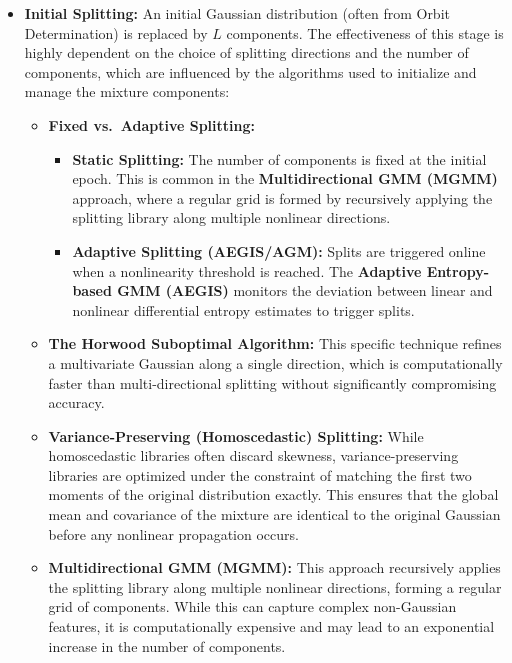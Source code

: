 \documentclass[
  letterpaper,
  DIV=11,
  numbers=noendperiod,
  oneside]{scrartcl}
\begin{document}
\begin{itemize}
\item
  \textbf{Initial Splitting:} An initial Gaussian distribution (often
  from Orbit Determination) is replaced by \(L\) components. The
  effectiveness of this stage is highly dependent on the choice of
  splitting directions and the number of components, which are
  influenced by the algorithms used to initialize and manage the mixture
  components:

  \begin{itemize}
  \item
    \textbf{Fixed vs.~Adaptive Splitting:}

    \begin{itemize}
    \item
      \textbf{Static Splitting:} The number of components is fixed at
      the initial epoch. This is common in the \textbf{Multidirectional
      GMM (MGMM)} approach, where a regular grid is formed by
      recursively applying the splitting library along multiple
      nonlinear directions.
    \item
      \textbf{Adaptive Splitting (AEGIS/AGM):} Splits are triggered
      online when a nonlinearity threshold is reached. The
      \textbf{Adaptive Entropy-based GMM (AEGIS)} monitors the deviation
      between linear and nonlinear differential entropy estimates to
      trigger splits.
    \end{itemize}
  \item
    \textbf{The Horwood Suboptimal Algorithm:} This specific technique
    refines a multivariate Gaussian along a single direction, which is
    computationally faster than multi-directional splitting without
    significantly compromising accuracy.
  \item
    \textbf{Variance-Preserving (Homoscedastic) Splitting:} While
    homoscedastic libraries often discard skewness, variance-preserving
    libraries are optimized under the constraint of matching the first
    two moments of the original distribution exactly. This ensures that
    the global mean and covariance of the mixture are identical to the
    original Gaussian before any nonlinear propagation occurs.
  \item
    \textbf{Multidirectional GMM (MGMM):} This approach recursively
    applies the splitting library along multiple nonlinear directions,
    forming a regular grid of components. While this can capture complex
    non-Gaussian features, it is computationally expensive and may lead
    to an exponential increase in the number of components.

\end{itemize}
\end{itemize}
\end{document}
